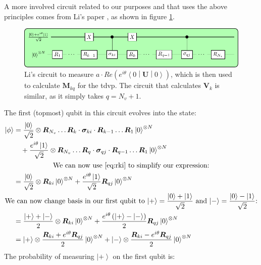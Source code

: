\documentclass{aux/ttuthes2007}
\newcommand{\ket}[1]{\ensuremath{\left|#1\right\rangle}}
\newcommand{\sandwich}[3]{\left< #1 \middle\vert #2 \middle\vert #3 \right>}
\newcommand{\paren}[1]{\left( #1 \right)}
\newcommand{\elec}{N}
\begin{document}
%
A more involved circuit related to our purposes and that uses the above principles comes from Li's paper , as shown in figure \ref{fig:circuitbenjamin}.
%
\begin{figure}[h!]
  \includegraphics[width=\linewidth]{circuits/circuit2.pdf}
  \caption[Li's circuit]{Li's circuit to measure $a \cdot Re\paren{e^{i\theta}\sandwich 0 {\bm U} 0}$, which is then used to calculate $\bm M_{kq}$ for the \gls{tdvp}. The circuit that calculates $\bm V_k$ is similar, as it simply takes $q = N_v + 1$.}
  \label{fig:circuitbenjamin}
\end{figure}
%
The first (topmost) qubit in this circuit evolves into the state:
%
\begin{equation*}
	\begin{split}
		\ket \phi 
		&= \frac{\ket 0}{\sqrt 2} \otimes \bm R_{N_v} \ldots \bm R_k \cdot \bm \sigma_{ki} \cdot \bm R_{k-1} \ldots \bm R_1 \ket 0^{\otimes \elec}\\
		&\quad + \frac{e^{i\theta}\ket 1}{\sqrt 2} \otimes \bm R_{N_v} \ldots \bm R_q \cdot \bm \sigma_{qj} \cdot \bm R_{q-1} \ldots \bm R_1 \ket 0^{\otimes \elec}\\
		\span\text{We can now use \ref{eq:rki} to simplify our expression:}\\
		&= \frac{\ket 0}{\sqrt 2} \otimes \bm R_{ki} \ket 0^{\otimes \elec}
		+ \frac{e^{i\theta}\ket 1}{\sqrt 2} \bm R_{qj}\ket 0^{\otimes \elec}\\
		\span\text{We can now change basis in our first qubit to
		$\ket + = \frac{\ket 0 + \ket 1}{\sqrt 2}$
		and
		$\ket - = \frac{\ket 0 - \ket 1}{\sqrt 2}$:}\\
		&= \frac{\ket + + \ket -}{2} \otimes \bm R_{ki} \ket 0^{\otimes \elec}
		+ \frac{e^{i\theta}\paren{\ket + - \ket -}}{2} \bm R_{qj}\ket 0^{\otimes \elec}\\
		&= \ket + \otimes \frac{\bm R_{ki} + e^{i\theta}\bm R_{qj}}{2} \ket 0^{\otimes \elec}
		 + \ket - \otimes \frac{\bm R_{ki} - e^{i\theta}\bm R_{qj}}{2} \ket 0^{\otimes \elec}
	\end{split}
\end{equation*}
The probability of measuring $\ket +$ on the first qubit is:
\end{document}
